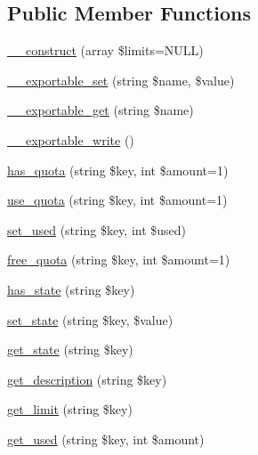 \subsection*{Public Member Functions}
\begin{DoxyCompactItemize}
\item 
\hyperlink{classlibresignage_1_1common_1_1php_1_1auth_1_1UserQuota_ab5bcb5536493282f478610e42e3b5962}{\+\_\+\+\_\+construct} (array \$limits=N\+U\+LL)
\item 
\hyperlink{classlibresignage_1_1common_1_1php_1_1auth_1_1UserQuota_a0d95ddbaa8afffd95ebb58342f250ef0}{\+\_\+\+\_\+exportable\+\_\+set} (string \$name, \$value)
\item 
\hyperlink{classlibresignage_1_1common_1_1php_1_1auth_1_1UserQuota_a394f430d75d902acaf70f7150833fdf9}{\+\_\+\+\_\+exportable\+\_\+get} (string \$name)
\item 
\hyperlink{classlibresignage_1_1common_1_1php_1_1auth_1_1UserQuota_a08275d00c5190a2c95917c0c7df12bbe}{\+\_\+\+\_\+exportable\+\_\+write} ()
\item 
\hyperlink{classlibresignage_1_1common_1_1php_1_1auth_1_1UserQuota_a98f246213ad32fa5ca902f630ae24f43}{has\+\_\+quota} (string \$key, int \$amount=1)
\item 
\hyperlink{classlibresignage_1_1common_1_1php_1_1auth_1_1UserQuota_a4430e4c5ab28cc6c7e04d7c8f54b3868}{use\+\_\+quota} (string \$key, int \$amount=1)
\item 
\hyperlink{classlibresignage_1_1common_1_1php_1_1auth_1_1UserQuota_a9a8ea1c65e5effba6989c5e58c0d77a5}{set\+\_\+used} (string \$key, int \$used)
\item 
\hyperlink{classlibresignage_1_1common_1_1php_1_1auth_1_1UserQuota_a38f394bc87fd5163519e3477f9d05d78}{free\+\_\+quota} (string \$key, int \$amount=1)
\item 
\hyperlink{classlibresignage_1_1common_1_1php_1_1auth_1_1UserQuota_a26ffb607251b12621337212939f6c82c}{has\+\_\+state} (string \$key)
\item 
\hyperlink{classlibresignage_1_1common_1_1php_1_1auth_1_1UserQuota_a6e7e8aa1e60e87c3f54bede17b77808c}{set\+\_\+state} (string \$key, \$value)
\item 
\hyperlink{classlibresignage_1_1common_1_1php_1_1auth_1_1UserQuota_aadba4ee57bd0e8d07df9e0352f5c59c4}{get\+\_\+state} (string \$key)
\item 
\hyperlink{classlibresignage_1_1common_1_1php_1_1auth_1_1UserQuota_a8e3b03eb87d39c9064953d128985f157}{get\+\_\+description} (string \$key)
\item 
\hyperlink{classlibresignage_1_1common_1_1php_1_1auth_1_1UserQuota_a29c6a821577a73acb335e7dad401494d}{get\+\_\+limit} (string \$key)
\item 
\hyperlink{classlibresignage_1_1common_1_1php_1_1auth_1_1UserQuota_aec342e48a63daa2d4c60e6fd89a987ec}{get\+\_\+used} (string \$key, int \$amount)
\end{DoxyCompactItemize}
